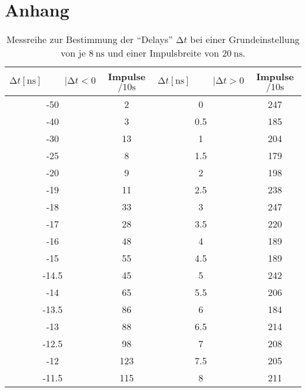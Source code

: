 \section{Anhang}

\begin{table}
    \centering
    \caption{Messreihe zur Bestimmung der \enquote{Delays} $\increment t$ bei einer Grundeinstellung von je $\SI{8}{\nano\second}$ und einer Impulsbreite von $\SI{20}{\nano\second}$. } 
    \label{tab:MessreiheDelay20ns}
    \begin{tabular}{c c || c c}
        \toprule
        $\increment t [\si{\nano\second}] \hspace{1cm}|\increment t < 0 $ & Impulse $\si{\per{10}\second} $ & $\increment t [\si{\nano\second}] \hspace{1cm}|\increment t > 0 $ & Impulse $\si{\per{10}\second}$ \\
        \midrule
            -50    &      2     &   0       &     247   \\               
            -40    &      3     &   0.5     &     185   \\ 
            -30    &      13    &   1       &     204   \\     
            -25    &      8     &   1.5     &     179   \\ 
            -20    &      9     &   2       &     198   \\     
            -19    &      11    &   2.5     &     238   \\  
            -18    &      33    &   3       &     247   \\     
            -17    &      28    &   3.5     &     220   \\  
            -16    &      48    &   4       &     189   \\     
            -15    &      55    &   4.5     &     189   \\     
            -14.5  &      45    &   5       &     242   \\     
            -14    &      65    &   5.5     &     206   \\  
            -13.5  &      86    &   6       &     184   \\     
            -13    &      88    &   6.5     &     214   \\  
            -12.5  &      98    &   7       &     208   \\     
            -12    &      123   &   7.5     &     205   \\   
            -11.5  &      115   &   8       &     211   \\      

\end{tabular}
\end{table}
